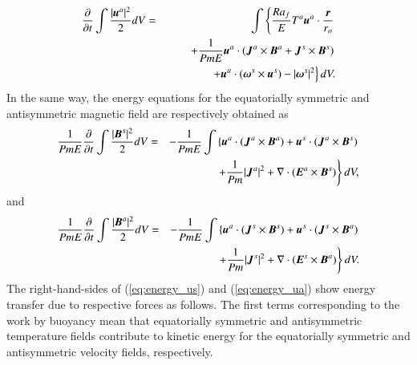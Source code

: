 %
\begin{eqnarray}
\displaystyle
\frac{\partial}{\partial t}
 \int \frac{|\mbox{\boldmath$u$}^a|^2}{2} d V 
 & = & \displaystyle
\int \left\{
      \frac{Ra_f}{E}T^a \mbox{\boldmath$u$}^a\cdot \frac{\mbox{\boldmath$r$}}{r_{o}}
     \right.
\nonumber \\
& & \displaystyle
\hspace*{2em}
     \left.
    + \frac{1}{Pm E} \mbox{\boldmath$u$}^a \cdot
                (\mbox{\boldmath$J$}^a \times \mbox{\boldmath$B$}^a
                +\mbox{\boldmath$J$}^s \times \mbox{\boldmath$B$}^s)
      \right.
\nonumber \\
& & \displaystyle
\hspace*{3em}
      \left.
    + \mbox{\boldmath$u$}^a \cdot 
       (\mbox{\boldmath$\omega$}^s \times \mbox{\boldmath$u$}^s)
    - |\mbox{\boldmath$\omega$}^s|^2 
      \right\} d V.
\label{eq:energy_ua}
\end{eqnarray}
%
In the same way, the energy equations for the equatorially symmetric and antisymmetric magnetic field are respectively obtained as
%
\begin{eqnarray}
\displaystyle
\frac{1}{Pm E}\frac{\partial}{\partial t}
 \int \frac{|\mbox{\boldmath$B$}^s|^2}{2} d V
 & = & - \frac{1}{Pm E}\int \left\{
      \mbox{\boldmath$u$}^a \cdot 
          ( \mbox{\boldmath$J$}^a \times \mbox{\boldmath$B$}^a )
    + \mbox{\boldmath$u$}^s \cdot 
          ( \mbox{\boldmath$J$}^a \times \mbox{\boldmath$B$}^s )
    \right.
\nonumber \\
\hspace{3em}
&& \displaystyle
    \left.
    + \frac{1}{Pm} |\mbox{\boldmath$J$}^a|^2
    + \nabla \cdot ( \mbox{\boldmath$E$}^a \times \mbox{\boldmath$B$}^s ) 
      \right\} d V,
\label{eq:energy_Bs}
\end{eqnarray}
%
and 
%
\begin{eqnarray}
\displaystyle
\frac{1}{Pm E}\frac{\partial}{\partial t}
 \int \frac{|\mbox{\boldmath$B$}^a|^2}{2} d V 
& = & \displaystyle
- \frac{1}{Pm E}\int \left\{
      \mbox{\boldmath$u$}^a \cdot 
          ( \mbox{\boldmath$J$}^s \times \mbox{\boldmath$B$}^s )
    + \mbox{\boldmath$u$}^s \cdot ( \mbox{\boldmath$J$}^s \times \mbox{\boldmath$B$}^a )
    \right.
\nonumber \\
\hspace{3em}
 & & \displaystyle
    \left.
    + \frac{1}{Pm} |\mbox{\boldmath$J$}^s|^2
    + \nabla \cdot ( \mbox{\boldmath$E$}^s \times \mbox{\boldmath$B$}^a ) 
      \right\} d V.
\label{eq:energy_Ba}
\end{eqnarray}
%
The right-hand-sides of (\ref{eq:energy_us}) and (\ref{eq:energy_ua}) show energy transfer due to respective forces as follows.
The first terms corresponding to the work by buoyancy mean that equatorially symmetric and antisymmetric temperature fields contribute to kinetic energy for the equatorially symmetric and antisymmetric velocity fields, respectively.
